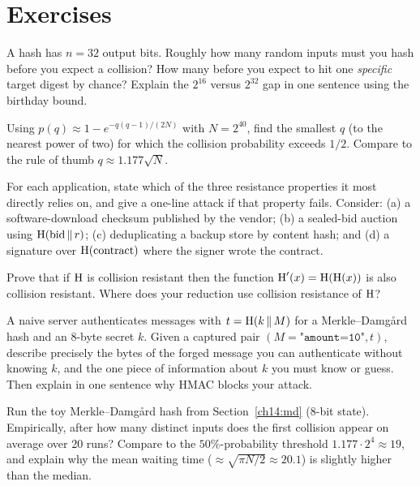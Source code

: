 \section{Exercises}
\label{ch14:exercises}

\begin{exercise}
A hash has $n = 32$ output bits. Roughly how many random inputs must you hash before you expect a collision? How many before you expect to hit one \emph{specific} target digest by chance? Explain the $2^{16}$ versus $2^{32}$ gap in one sentence using the birthday bound.
\end{exercise}

\begin{exercise}
Using $p(q) \approx 1 - e^{-q(q-1)/(2N)}$ with $N = 2^{40}$, find the smallest $q$ (to the nearest power of two) for which the collision probability exceeds $1/2$. Compare to the rule of thumb $q \approx 1.177\sqrt{N}$.
\end{exercise}

\begin{exercise}
For each application, state which of the three resistance properties it most directly relies on, and give a one-line attack if that property fails. Consider: (a) a software-download checksum published by the vendor; (b) a sealed-bid auction using $\operatorname{H}(\text{bid}\,\|\, r)$; (c) deduplicating a backup store by content hash; and (d) a signature over $\operatorname{H}(\text{contract})$ where the signer wrote the contract.
\end{exercise}

\begin{exercise}[Reduction]
Prove that if $\operatorname{H}$ is collision resistant then the function $\operatorname{H}'(x) = \operatorname{H}(\operatorname{H}(x))$ is also collision resistant. Where does your reduction use collision resistance of $\operatorname{H}$?
\end{exercise}

\begin{exercise}
A naive server authenticates messages with $t = \operatorname{H}(k \,\|\, M)$ for a Merkle--Damg\aa{}rd hash and an 8-byte secret $k$. Given a captured pair $(M = \texttt{"amount=10"}, t)$, describe precisely the bytes of the forged message you can authenticate without knowing $k$, and the one piece of information about $k$ you must know or guess. Then explain in one sentence why HMAC blocks your attack.
\end{exercise}

\begin{exercise}
Run the toy Merkle--Damg\aa{}rd hash from Section~\ref{ch14:md} (8-bit state). Empirically, after how many distinct inputs does the first collision appear on average over 20 runs? Compare to the $50\%$-probability threshold $1.177 \cdot 2^{4} \approx 19$, and explain why the mean waiting time ($\approx \sqrt{\pi N / 2} \approx 20.1$) is slightly higher than the median.
\end{exercise}

